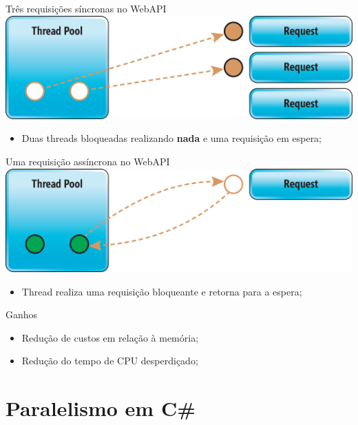 \documentclass[10pt]{beamer}
\begin{document}
\begin{frame}{Três requisições síncronas no WebAPI}
	\includegraphics[width=\textwidth]{imgs/sync2}
	\vspace{0.5cm}
	
	\begin{itemize}
		\item Duas threads bloqueadas realizando \textbf{nada} e uma requisição em espera;
	\end{itemize}
\end{frame}

\begin{frame}{Uma requisição assíncrona no WebAPI}
	\includegraphics[width=\textwidth]{imgs/async}
	\vspace{0.5cm}
	
	\begin{itemize}
		\item Thread realiza uma requisição bloqueante e retorna para a espera;
	\end{itemize}
\end{frame}

\begin{frame}{Ganhos}
	\begin{itemize}
		\item Redução de custos em relação à memória;
		\vspace{0.2cm}
		\item Redução do tempo de CPU desperdiçado;
	\end{itemize}
\end{frame}

\section{Paralelismo em C\#}
\end{document}
